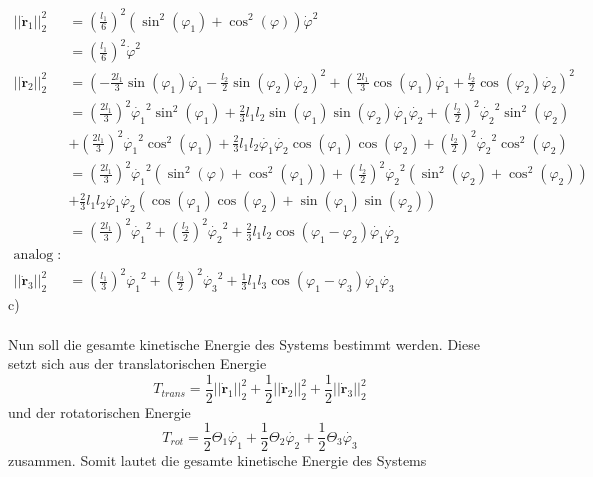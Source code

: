 \begin{align*}
	||\dot{\textbf{r}}_1||_2^2 &= \left(\frac{l_1}{6}\right)^2 (\sin^2(\varphi_1) + \cos^2(\varphi))\dot{\varphi}^2\\ 
	&= \left(\frac{l_1}{6}\right)^2\dot{\varphi}^2 \\
	||\dot{\textbf{r}}_2||_2^2 &= \left(-\frac{2l_1}{3}\sin(\varphi_1)\dot{\varphi_1} - \frac{l_2}{2}\sin(\varphi_2)\dot{\varphi_2}\right)^2
	+
	\left(\frac{2l_1}{3}\cos(\varphi_1)\dot{\varphi_1} + \frac{l_2}{2}\cos(\varphi_2)\dot{\varphi_2}\right)^2 \\
	&= \left(\frac{2l_1}{3}\right)^2\dot{\varphi_1}^2\sin^2(\varphi_1) + \frac{2}{3}l_1l_2\sin(\varphi_1)\sin(\varphi_2)\dot{\varphi_1}\dot{\varphi_2} + \left(\frac{l_2}{2}\right)^2\dot{\varphi_2}^2\sin^2(\varphi_2) \\
	&+ \left(\frac{2l_1}{3}\right)^2\dot{\varphi_1}^2\cos^2(\varphi_1) + \frac{2}{3}l_1l_2\dot{\varphi_1}\dot{\varphi_2}\cos(\varphi_1)\cos(\varphi_2) + \left(\frac{l_2}{2}\right)^2\dot{\varphi_2}^2\cos^2(\varphi_2) \\
	&= \left(\frac{2l_1}{3}\right)^2\dot{\varphi_1}^2\left(\sin^2(\varphi) + \cos^2(\varphi_1)\right) + \left(\frac{l_2}{2}\right)^2\dot{\varphi_2}^2\left(\sin^2(\varphi_2) + \cos^2(\varphi_2)\right) \\
	&+ \frac{2}{3}l_1l_2\dot{\varphi_1}\dot{\varphi_2}\left(\cos(\varphi_1)\cos(\varphi_2) + \sin(\varphi_1)\sin(\varphi_2)\right) \\
	&=  \left(\frac{2l_1}{3}\right)^2\dot{\varphi_1}^2 + \left(\frac{l_2}{2}\right)^2\dot{\varphi_2}^2 + \frac{2}{3}l_1l_2\cos(\varphi_1 - \varphi_2)\dot{\varphi_1}\dot{\varphi_2} \\
	\text{analog dazu}: \\
	||\dot{\textbf{r}}_3||_2^2 &= \left(\frac{l_1}{3}\right)^2\dot{\varphi_1}^2 + \left(\frac{l_3}{2}\right)^2\dot{\varphi_3}^2 + \frac{1}{3}l_1l_3\cos(\varphi_1 - \varphi_3)\dot{\varphi_1}\dot{\varphi_3}
\end{align*}
c)\\ \\
Nun soll die gesamte kinetische Energie des Systems bestimmt werden. Diese setzt sich aus der translatorischen Energie
\[
	T_{trans} = \frac{1}{2}||\dot{\textbf{r}}_1||^2_2 + \frac{1}{2}||\dot{\textbf{r}}_2||^2_2 + \frac{1}{2}||\dot{\textbf{r}}_3||^2_2
\]
und der rotatorischen Energie
\[
	T_{rot} = \frac{1}{2}\varTheta_1\dot{\varphi_1} + \frac{1}{2}\varTheta_2\dot{\varphi_2} + \frac{1}{2}\varTheta_3\dot{\varphi_3}
\]
zusammen.
\newpage
\noindent
Somit lautet die gesamte kinetische Energie des Systems
